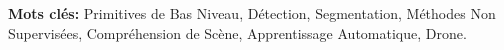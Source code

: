 %
  
\vspace*{\fill}

\textbf{Mots clés:} Primitives de Bas Niveau, Détection, Segmentation, Méthodes Non Supervisées, Compréhension de Scène, Apprentissage Automatique, Drone.